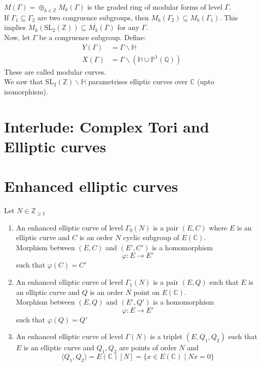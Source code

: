 \documentclass[oneside, 12pt]{scrbook}
\newcommand{\CC}{\mathbb C}
\newcommand{\QQ}{\mathbb Q}
\newcommand{\ZZ}{\mathbb Z}
\newcommand{\PP}{\mathbb{P}}
\newcommand{\SL}{\mathrm{SL}}
\newcommand{\HH}{\mathbb{H}}
\theoremstyle{theorem}
\begin{document}
$M(\Gamma) = \oplus_{k \in \ZZ} M_{k}(\Gamma)$ is the graded ring of modular forms of level $\Gamma$. \\

If $\Gamma_{1} \subseteq \Gamma_{2}$ are two congruence subgroups, then $M_{k}(\Gamma_{2}) \subseteq M_{k}(\Gamma_{1})$. This implies $M_{k}(\SL_{2}(\ZZ)) \subseteq M_{k}(\Gamma)$ for any $\Gamma$.\\

Now, let $\Gamma$ be a congruence subgroup. Define: 
\begin{align*}
Y(\Gamma) &= \Gamma \backslash \mathbb{H} \\
X(\Gamma) &= \Gamma \backslash (\mathbb{H} \cup \PP^1 (\QQ))
\end{align*}
These are called modular curves. \\

We saw that $\SL_{2}(\ZZ) \backslash \HH$ parametrises elliptic curves over $\CC$ (upto isomorphism).

\section{Interlude: Complex Tori and Elliptic curves}



\section{Enhanced elliptic curves}
Let $N \in \ZZ_{\geq 1}$
\begin{definition}
\begin{enumerate}
\item An enhanced elliptic curve of level $\Gamma_{0}(N)$ is a pair $(E,C)$ where $E$ is an elliptic curve and $C$ is an order $N$ cyclic subgroup of $E(\CC)$. \\
Morphism between $(E,C)$ and $(E',C')$ is a homomorphism $$\varphi : E \rightarrow E'$$ such that $\varphi (C) = C'$
\item An enhanced elliptic curve of level $\Gamma_{1}(N)$ is a pair $(E,Q)$ such that  $E$ is an elliptic curve and $Q$ is an order $N$ point on $E(\CC)$. \\
Morphism between $(E,Q)$ and $(E',Q')$ is a homomorphism $$\varphi : E \rightarrow E'$$ such that $\varphi (Q) = Q'$
\item An enhanced elliptic curve of level $\Gamma(N)$ is a triplet $(E,Q_{1},Q_{2})$ such that $E$ is an elliptic curve and $Q_{1},Q_{2}$ are points of order $N$ and $$\langle Q_{1} , Q_{2} \rangle = E(\CC)[N] = \{ x \in E(\CC) \mid Nx =0\}$$
\end{enumerate}
\end{definition}
\end{document}
